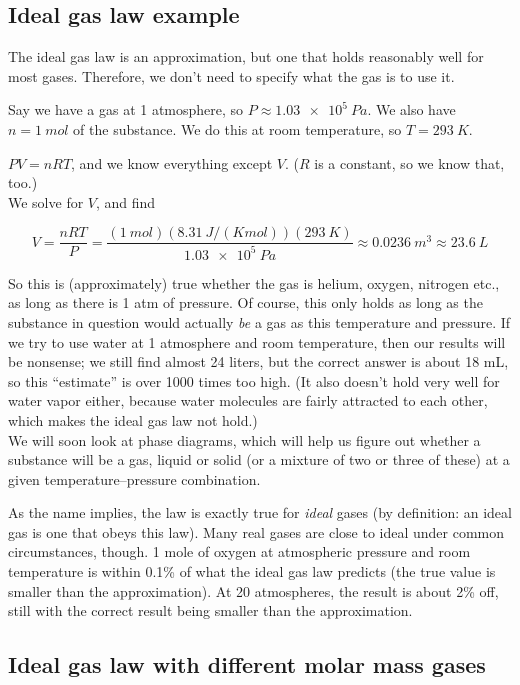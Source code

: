 \documentclass[8.01x]{subfiles}
\begin{document}
\subsection{Ideal gas law example}

The ideal gas law is an approximation, but one that holds reasonably well for most gases. Therefore, we don't need to specify what the gas is to use it.

Say we have a gas at 1 atmosphere, so $P \approx \SI{1.03e5}{Pa}$. We also have $n = \SI{1}{mol}$ of the substance. We do this at room temperature, so $T = \SI{293}{K}$.

$P V = n R T$, and we know everything except $V$. ($R$ is a constant, so we know that, too.)\\
We solve for $V$, and find

\begin{equation}
V = \frac{n R T}{P} = \frac{(\SI{1}{mol})(\SI{8.31}{J/(K mol)})(\SI{293}{K})}{\SI{1.03e5}{Pa}} \approx \SI{0.0236}{m^3} \approx \SI{23.6}{L}
\end{equation}

So this is (approximately) true whether the gas is helium, oxygen, nitrogen etc., as long as there is 1 atm of pressure. Of course, this only holds as long as the substance in question would actually \emph{be} a gas as this temperature and pressure. If we try to use water at 1 atmosphere and room temperature, then our results will be nonsense; we still find almost 24 liters, but the correct answer is about 18 mL, so this ``estimate'' is over 1000 times too high. (It also doesn't hold very well for water vapor either, because water molecules are fairly attracted to each other, which makes the ideal gas law not hold.)\\
We will soon look at phase diagrams, which will help us figure out whether a substance will be a gas, liquid or solid (or a mixture of two or three of these) at a given temperature--pressure combination.

As the name implies, the law is exactly true for \emph{ideal} gases (by definition: an ideal gas is one that obeys this law). Many real gases are close to ideal under common circumstances, though. 1 mole of oxygen at atmospheric pressure and room temperature is within 0.1\% of what the ideal gas law predicts (the true value is smaller than the approximation). At 20 atmospheres, the result is about 2\% off, still with the correct result being smaller than the approximation.

\subsection{Ideal gas law with different molar mass gases}
\end{document}
